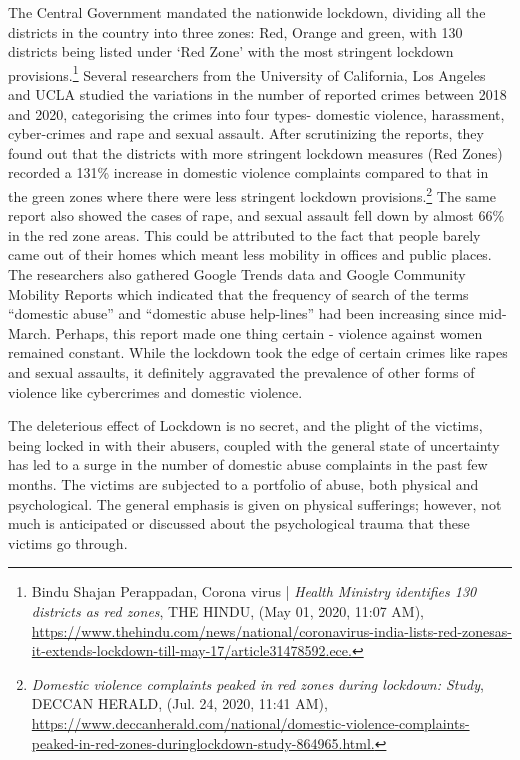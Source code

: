 \begin{multicols}{2}
\noi
The Central Government mandated the nationwide lockdown, dividing all the districts in the
country into three zones: Red, Orange and green, with 130 districts being listed under ‘Red
Zone’ with the most stringent lockdown provisions.\footnote{Bindu Shajan Perappadan, Corona virus | \textit{Health Ministry identifies 130 districts as red zones}, THE HINDU,
(May 01, 2020, 11:07 AM), \url{https://www.thehindu.com/news/national/coronavirus-india-lists-red-zonesas-it-extends-lockdown-till-may-17/article31478592.ece.}} Several researchers from the University
of California, Los Angeles and UCLA studied the variations in the number of reported crimes
between 2018 and 2020, categorising the crimes into four types- domestic violence,
harassment, cyber-crimes and rape and sexual assault. After scrutinizing the reports, they
found out that the districts with more stringent lockdown measures (Red Zones) recorded a
131\% increase in domestic violence complaints compared to that in the green zones where
there were less stringent lockdown provisions.\footnote{\textit{Domestic violence complaints peaked in red zones during lockdown: Study}, DECCAN HERALD, (Jul. 24, 2020,
11:41 AM),\\ \url{https://www.deccanherald.com/national/domestic-violence-complaints-peaked-in-red-zones-duringlockdown-study-864965.html.}} The same report also showed the cases of
rape, and sexual assault fell down by almost 66\% in the red zone areas. This could be attributed to the fact that people barely came out of their homes which meant less mobility in
offices and public places. The researchers also gathered Google Trends data and Google
Community Mobility Reports which indicated that the frequency of search of the terms
“domestic abuse” and “domestic abuse help-lines” had been increasing since mid-March.
Perhaps, this report made one thing certain - violence against women remained constant.
While the lockdown took the edge of certain crimes like rapes and sexual assaults, it
definitely aggravated the prevalence of other forms of violence like cybercrimes and
domestic violence.


\vspace{.08cm}

\noi
The deleterious effect of Lockdown is no secret, and the plight of the victims, being locked in
with their abusers, coupled with the general state of uncertainty has led to a surge in the
number of domestic abuse complaints in the past few months. The victims are subjected to a
portfolio of abuse, both physical and psychological. The general emphasis is given on
physical sufferings; however, not much is anticipated or discussed about the psychological
trauma that these victims go through.


\end{multicols}
